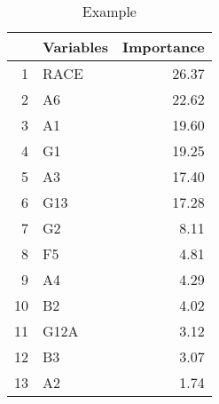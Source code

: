 \begin{table}[ht]
\centering
\begin{tabular}{rlr}
  \toprule
 & Variables & Importance \\ 
  \midrule
1 & RACE & 26.37 \\ 
  2 & A6 & 22.62 \\ 
  3 & A1 & 19.60 \\ 
  4 & G1 & 19.25 \\ 
  5 & A3 & 17.40 \\ 
  6 & G13 & 17.28 \\ 
  7 & G2 & 8.11 \\ 
  8 & F5 & 4.81 \\ 
  9 & A4 & 4.29 \\ 
  10 & B2 & 4.02 \\ 
  11 & G12A & 3.12 \\ 
  12 & B3 & 3.07 \\ 
  13 & A2 & 1.74 \\ 
   \bottomrule
\end{tabular}
\caption{Example} 
\end{table}
